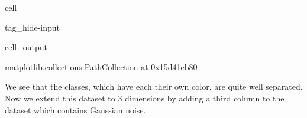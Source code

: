 \documentclass[letterpaper,10pt,english]{jupyterBook}
\begin{document}
\begin{sphinxuseclass}{cell}
\begin{sphinxuseclass}{tag_hide-input}\begin{sphinxVerbatimOutput}

\begin{sphinxuseclass}{cell_output}
\begin{sphinxVerbatim}[commandchars=\\\{\}]
\PYGZlt{}matplotlib.collections.PathCollection at 0x15d41eb80\PYGZgt{}
\end{sphinxVerbatim}

\noindent{}

\end{sphinxuseclass}\end{sphinxVerbatimOutput}

\end{sphinxuseclass}
\end{sphinxuseclass}
\sphinxAtStartPar
We see that the classes, which have each their own color, are quite well separated. Now we extend this dataset to 3 dimensions by adding a third column to the dataset which contains Gaussian noise.
\end{document}
